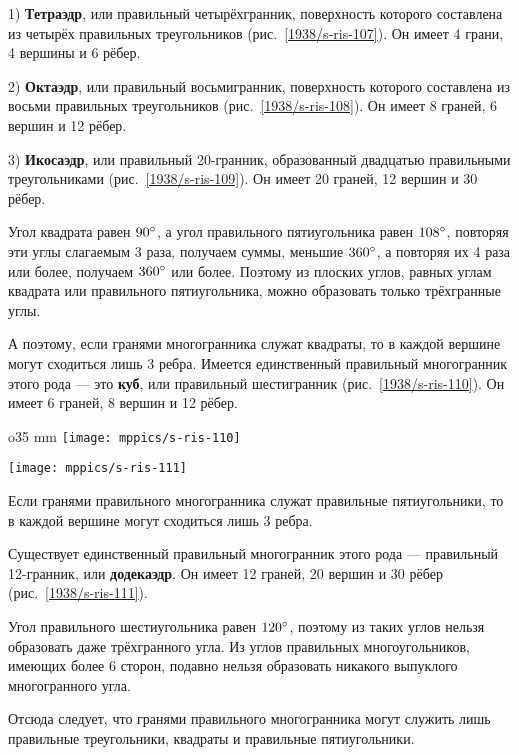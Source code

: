 {1) \textbf{Тетраэдр}, или правильный четырёхгранник, поверхность которого составлена из четырёх правильных треугольников (рис.~\ref{1938/s-ris-107}).
Он имеет 4 грани, 4 вершины и 6 рёбер.

2) \textbf{Октаэдр}, или правильный восьмигранник, поверхность которого составлена из восьми правильных треугольников (рис.~\ref{1938/s-ris-108}).
Он имеет 8 граней, 6 вершин и 12 рёбер.

3) \textbf{Икосаэдр}, или правильный 20-гранник, образованный двадцатью правильными треугольниками (рис.~\ref{1938/s-ris-109}).
Он имеет 20 граней, 12 вершин и 30 рёбер.

Угол квадрата равен $90\degree$, а угол правильного пятиугольника равен $108\degree$, повторяя эти углы слагаемым 3 раза, получаем суммы, меньшие $360\degree$, а повторяя их 4 раза или более, получаем $360\degree$ или более.
Поэтому из плоских углов, равных углам квадрата или правильного пятиугольника, можно образовать только трёхгранные углы.

А поэтому, если гранями многогранника служат квадраты, то в каждой вершине могут сходиться лишь 3 ребра.
Имеется единственный правильный многогранник этого рода — это \textbf{куб}, или правильный шестигранник (рис.~\ref{1938/s-ris-110}).
Он имеет 6 граней, 8 вершин и 12 рёбер.

\begin{wrapfigure}{o}{35 mm}
\vskip-0mm
\centering
\texttt{[image: mppics/s-ris-110]}
\caption{}\label{1938/s-ris-110}
\bigskip
\texttt{[image: mppics/s-ris-111]}
\caption{}\label{1938/s-ris-111}
\vskip-0mm
\end{wrapfigure}

Если гранями правильного многогранника служат правильные пятиугольники, то в каждой вершине могут сходиться лишь 3 ребра.

Существует единственный правильный многогранник этого рода — правильный 12-гранник, или \textbf{додекаэдр}.
Он имеет 12 граней, 20 вершин и 30 рёбер (рис.~\ref{1938/s-ris-111}).

Угол правильного шестиугольника равен $120\degree$, поэтому из таких углов нельзя образовать даже трёхгранного угла.
Из углов правильных многоугольников, имеющих более 6 сторон, подавно нельзя образовать никакого выпуклого многогранного угла.

Отсюда следует, что гранями правильного многогранника могут служить лишь правильные треугольники, квадраты и правильные пятиугольники.

}
